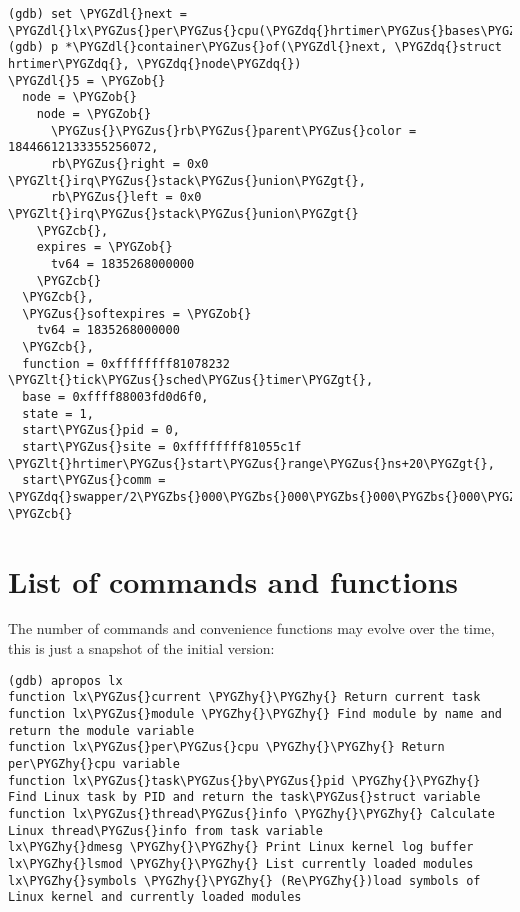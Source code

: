 \documentclass[a4paper,8pt,english]{sphinxmanual}
\def\PYGZbs{\char`\\}
\def\PYGZus{\char`\_}
\def\PYGZob{\char`\{}
\def\PYGZcb{\char`\}}
\def\PYGZlt{\char`\<}
\def\PYGZgt{\char`\>}
\def\PYGZdl{\char`\$}
\def\PYGZhy{\char`\-}
\def\PYGZdq{\char`\"}
\begin{document}
\begin{itemize}
\begin{Verbatim}[commandchars=\\\{\}]
(gdb) set \PYGZdl{}next = \PYGZdl{}lx\PYGZus{}per\PYGZus{}cpu(\PYGZdq{}hrtimer\PYGZus{}bases\PYGZdq{}).clock\PYGZus{}base[0].active.next
(gdb) p *\PYGZdl{}container\PYGZus{}of(\PYGZdl{}next, \PYGZdq{}struct hrtimer\PYGZdq{}, \PYGZdq{}node\PYGZdq{})
\PYGZdl{}5 = \PYGZob{}
  node = \PYGZob{}
    node = \PYGZob{}
      \PYGZus{}\PYGZus{}rb\PYGZus{}parent\PYGZus{}color = 18446612133355256072,
      rb\PYGZus{}right = 0x0 \PYGZlt{}irq\PYGZus{}stack\PYGZus{}union\PYGZgt{},
      rb\PYGZus{}left = 0x0 \PYGZlt{}irq\PYGZus{}stack\PYGZus{}union\PYGZgt{}
    \PYGZcb{},
    expires = \PYGZob{}
      tv64 = 1835268000000
    \PYGZcb{}
  \PYGZcb{},
  \PYGZus{}softexpires = \PYGZob{}
    tv64 = 1835268000000
  \PYGZcb{},
  function = 0xffffffff81078232 \PYGZlt{}tick\PYGZus{}sched\PYGZus{}timer\PYGZgt{},
  base = 0xffff88003fd0d6f0,
  state = 1,
  start\PYGZus{}pid = 0,
  start\PYGZus{}site = 0xffffffff81055c1f \PYGZlt{}hrtimer\PYGZus{}start\PYGZus{}range\PYGZus{}ns+20\PYGZgt{},
  start\PYGZus{}comm = \PYGZdq{}swapper/2\PYGZbs{}000\PYGZbs{}000\PYGZbs{}000\PYGZbs{}000\PYGZbs{}000\PYGZbs{}000\PYGZdq{}
\PYGZcb{}
\end{Verbatim}

\end{itemize}


\section{List of commands and functions}
\label{dev-tools/gdb-kernel-debugging:list-of-commands-and-functions}
The number of commands and convenience functions may evolve over the time,
this is just a snapshot of the initial version:

\begin{Verbatim}[commandchars=\\\{\}]
(gdb) apropos lx
function lx\PYGZus{}current \PYGZhy{}\PYGZhy{} Return current task
function lx\PYGZus{}module \PYGZhy{}\PYGZhy{} Find module by name and return the module variable
function lx\PYGZus{}per\PYGZus{}cpu \PYGZhy{}\PYGZhy{} Return per\PYGZhy{}cpu variable
function lx\PYGZus{}task\PYGZus{}by\PYGZus{}pid \PYGZhy{}\PYGZhy{} Find Linux task by PID and return the task\PYGZus{}struct variable
function lx\PYGZus{}thread\PYGZus{}info \PYGZhy{}\PYGZhy{} Calculate Linux thread\PYGZus{}info from task variable
lx\PYGZhy{}dmesg \PYGZhy{}\PYGZhy{} Print Linux kernel log buffer
lx\PYGZhy{}lsmod \PYGZhy{}\PYGZhy{} List currently loaded modules
lx\PYGZhy{}symbols \PYGZhy{}\PYGZhy{} (Re\PYGZhy{})load symbols of Linux kernel and currently loaded modules
\end{Verbatim}
\end{document}
